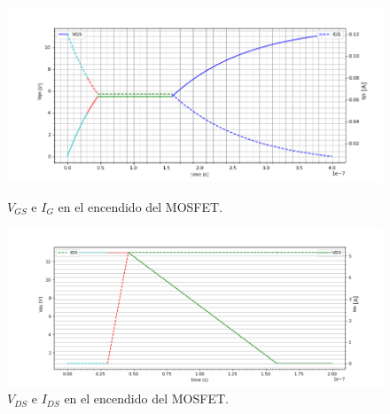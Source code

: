 \begin{figure}[H]
	\centering
	\begin{minipage}{0.45\textwidth}
		\centering	
		\includegraphics[width=\linewidth]{ImagenesEjercicio-1/encendido_gate}
		\caption{$V_{GS}$ e $I_{G}$ en el encendido del MOSFET.}
		\label{ej1:fig:encendido_gate}
	\end{minipage}\hfill
	\begin{minipage}{0.45\textwidth}
		\centering
		\includegraphics[width=\linewidth]{ImagenesEjercicio-1/encendido_drain}
		\caption{$V_{DS}$ e $I_{DS}$ en el encendido del MOSFET.}
		\label{ej1:fig:encendido_drain}
	\end{minipage}\hfill
\end{figure}

